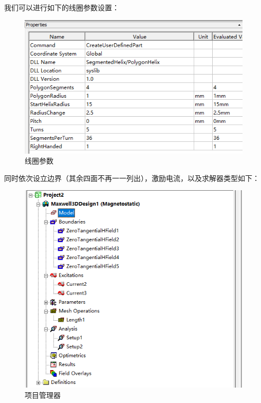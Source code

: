 \documentclass{article}
\begin{document}
我们可以进行如下的线圈参数设置：

\begin{figure}[h]
  \centering
  \includegraphics[scale=0.4]{procedure/property.png}
  \caption{线圈参数}
  \label{fig:example}
\end{figure}\textbf{}

同时依次设立边界（其余四面不再一一列出），激励电流，以及求解器类型如下：

\begin{figure}[h]
  \centering
  \includegraphics[scale=0.3]{procedure/helper.png}
  \caption{项目管理器}
  \label{fig:example}
\end{figure}\textbf{}
\end{document}
